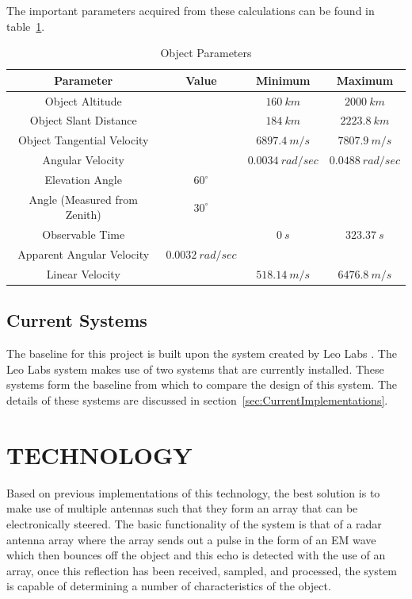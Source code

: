 \documentclass[11pt]{witseiepaper}
\begin{document}
The important parameters acquired from these calculations can be found in table~\ref{tab:ImportantObjectParameters}.

\begin{table}
    \caption{Object Parameters}
    \label{tab:ImportantObjectParameters}
    \begin{center}
        \begin{tabular}{c c c c}
            \hline 
            Parameter & Value & Minimum & Maximum \\
            \hline
            Object Altitude & & $160~km$ & $2000~km$ \\
            Object Slant Distance & & $184~km$ & $2223.8~km$ \\
            Object Tangential Velocity & & $6897.4~m/s$ & $7807.9~m/s$ \\
            Angular Velocity & & $0.0034~rad/sec$ & $0.0488~rad/sec$ \\
            Elevation Angle & $60^{\circ}$ & &  \\
            Angle (Measured from Zenith) & $30^{\circ}$ & &  \\
            Observable Time & & $0~s$ & $323.37~s$ \\
            Apparent Angular Velocity & $0.0032~rad/sec$ & & \\
            Linear Velocity & &  $518.14~m/s$ & $6476.8~m/s$ \\
        \end{tabular}
    \end{center}
\end{table}

\subsection{Current Systems} \label{sec:CurrentSystems}
The baseline for this project is built upon the system created by Leo Labs \cite{LEOLABS}. The Leo Labs system makes use of two systems that are currently installed. These systems form the baseline from which to compare the design of this system. The details of these systems are discussed in section~\ref{sec:CurrentImplementations}.


\section{TECHNOLOGY} \label{sec:TECHNOLOGY}
Based on previous implementations of this technology, the best solution is to make use of multiple antennas such that they form an array that can be electronically steered.
The basic functionality of the system is that of a radar antenna array where the array sends out a pulse in the form of an EM wave which then bounces off the object and this echo is detected with the use of an array, once this reflection has been received, sampled, and processed, the system is capable of determining a number of characteristics of the object.
\end{document}
